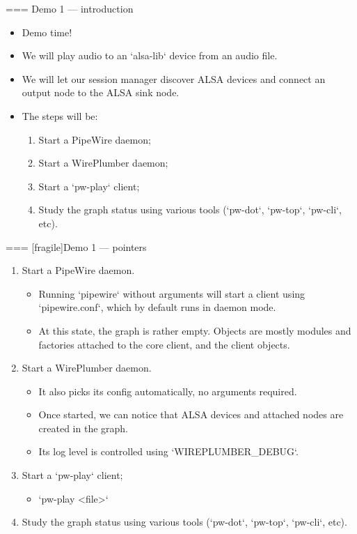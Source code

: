 === {Demo 1 — introduction}
  \begin{itemize}

  \item Demo time!

  \item We will play audio to an `alsa-lib` device from an audio
    file.

  \item We will let our session manager discover ALSA devices and
    connect an output node to the ALSA sink node.

  \item The steps will be:

    \begin{enumerate}
    \item Start a PipeWire daemon;
    \item Start a WirePlumber daemon;
    \item Start a `pw-play` client;
    \item Study the graph status using various tools (`pw-dot`,
      `pw-top`, `pw-cli`, etc).
    \end{enumerate}

  \end{itemize}




=== [fragile]{Demo 1 — pointers}
  \begin{enumerate}

  \item Start a PipeWire daemon.

    \begin{itemize}
    \item Running `pipewire` without arguments will start a client
      using `pipewire.conf`, which by default runs in daemon mode.
    \item At this state, the graph is rather empty. Objects are mostly
      modules and factories attached to the core client, and the
      client objects.
    \end{itemize}

  \item Start a WirePlumber daemon.
    \begin{itemize}
    \item It also picks its config automatically, no arguments required.
    \item Once started, we can notice that ALSA devices and attached
      nodes are created in the graph.
    \item Its log level is controlled using `WIREPLUMBER_DEBUG`.
    \end{itemize}

  \item Start a `pw-play` client;

    \begin{itemize}
    \item `pw-play <file>`
    \end{itemize}

  \item Study the graph status using various tools (`pw-dot`,
      `pw-top`, `pw-cli`, etc).

  \end{enumerate}




